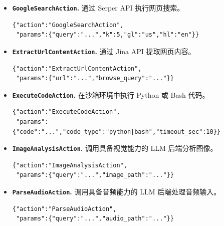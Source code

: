 \begin{itemize}
\item \textbf{\texttt{GoogleSearchAction}.} 通过 Serper API 执行网页搜索。
\begin{tcolorbox}[colback=gray!5,colframe=gray!70,arc=0mm,boxrule=1pt]
\begin{verbatim}
{"action":"GoogleSearchAction",
 "params":{"query":"...","k":5,"gl":"us","hl":"en"}}
\end{verbatim}
\end{tcolorbox}

\item \textbf{\texttt{ExtractUrlContentAction}.} 通过 Jina API 提取网页内容。
\begin{tcolorbox}[colback=gray!5,colframe=gray!70,arc=0mm,boxrule=1pt]
\begin{verbatim}
{"action":"ExtractUrlContentAction",
 "params":{"url":"...","browse_query":"..."}}
\end{verbatim}
\end{tcolorbox}

\item \textbf{\texttt{ExecuteCodeAction}.} 在沙箱环境中执行 Python 或 Bash 代码。
\begin{tcolorbox}[colback=gray!5,colframe=gray!70,arc=0mm,boxrule=1pt]
\begin{verbatim}
{"action":"ExecuteCodeAction",
 "params":{"code":"...","code_type":"python|bash","timeout_sec":10}}
\end{verbatim}
\end{tcolorbox}

\item \textbf{\texttt{ImageAnalysisAction}.} 调用具备视觉能力的 LLM 后端分析图像。
\begin{tcolorbox}[colback=gray!5,colframe=gray!70,arc=0mm,boxrule=1pt]
\begin{verbatim}
{"action":"ImageAnalysisAction",
 "params":{"query":"...","image_path":"..."}}
\end{verbatim}
\end{tcolorbox}

\item \textbf{\texttt{ParseAudioAction}.} 调用具备音频能力的 LLM 后端处理音频输入。
\begin{tcolorbox}[colback=gray!5,colframe=gray!70,arc=0mm,boxrule=1pt]
\begin{verbatim}
{"action":"ParseAudioAction",
 "params":{"query":"...","audio_path":"..."}}
\end{verbatim}
\end{tcolorbox}


\end{itemize}
